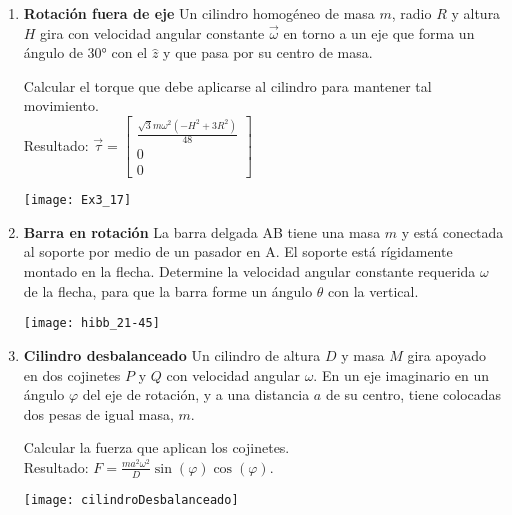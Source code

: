 \documentclass[11pt, spanish, a4paper, twoside]{article}
\begin{document}
\begin{enumerate}
	\item
	\begin{minipage}[t][3cm]{0.75\textwidth}
		\textbf{Rotación fuera de eje}
		Un cilindro homogéneo de masa \(m\), radio \(R\) y altura \(H\) gira con velocidad angular constante \(\vec{\omega}\) en torno a un eje que forma un ángulo de \ang{30;;} con el \(\hat{z}\) y que pasa por su centro de masa.
		\begin{tasks}
			\task Calcular el torque que debe aplicarse al cilindro para mantener tal movimiento.\\
			Resultado: \(
			\vec{\tau} = \left[\begin{matrix}\frac{\sqrt{3} m \omega^{2} \left(- H^{2} + 3 R^{2}\right)}{48}\\0\\0\end{matrix}\right]
			\) 
		\end{tasks}
	\end{minipage}
	\begin{minipage}[c][2cm][t]{0.2\textwidth}
		\texttt{[image: Ex3\_17]}
	\end{minipage}



	\item 
	\begin{minipage}[t][4.5cm]{0.75\textwidth}
		\textbf{Barra en rotación}
		La barra delgada AB tiene una masa \(m\) y está conectada al soporte por medio de un pasador en A.
		El soporte está rígidamente montado en la flecha.
		Determine la velocidad angular constante requerida \(\omega\) de la flecha, para que la barra forme un ángulo \(\theta\) con la vertical.
	\end{minipage}
	\begin{minipage}[c][3cm][t]{0.2\textwidth}
		\texttt{[image: hibb\_21-45]}
	\end{minipage}


	\item 
	\begin{minipage}[t][3.5cm]{0.6\textwidth}
	\textbf{Cilindro desbalanceado}
		Un cilindro de altura \(D\) y masa \(M\) gira apoyado en dos cojinetes \(P\) y \(Q\) con velocidad angular \(\omega\).
		En un eje imaginario en un ángulo \(\varphi\) del eje de rotación, y a una distancia \(a\) de su centro, tiene colocadas dos pesas de igual masa, \(m\). 
		\begin{tasks} 
			\task Calcular la fuerza que aplican los cojinetes.\\
			Resultado: \(
				F = \frac{m a^2 \omega^2}{D} \sin(\varphi) \cos(\varphi)
			\).
		\end{tasks}
	\end{minipage}
	\begin{minipage}[c][0.5cm][t]{0.35\textwidth}
		\texttt{[image: cilindroDesbalanceado]}
	\end{minipage}
		


\end{enumerate}
\end{document}
